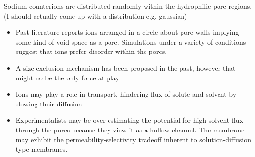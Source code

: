 \documentclass{article}
\begin{document}
	Sodium counterions are distributed randomly within the hydrophilic pore regions. (I should actually come up with a distribution e.g. gaussian)
	\begin{itemize}
		\item Past literature reports ions arranged in a circle about pore walls implying some kind of void space as a pore. Simulations under a variety of conditions suggest that ions prefer disorder within the pores. 
		\item A size exclusion mechanism has been proposed in the past, however that might no be the only force at play
		\item Ions may play a role in transport, hindering flux of solute and solvent by slowing their diffusion
		\item Experimentalists may be over-estimating the potential for high solvent flux through the pores because they view it as a hollow channel. The membrane may exhibit the permeability-selectivity tradeoff inherent to solution-diffusion type membranes. %
        \end{itemize}	
\end{document}
